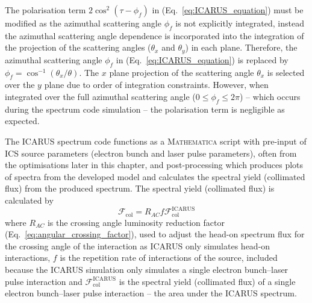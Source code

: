 \documentclass[../main.tex]{subfiles}
\begin{document}
The polarisation term $2\cos^{2}\left(\tau-\phi_{f}\right)$ in (Eq.~\ref{eq:ICARUS_equation}) must be modified as the azimuthal scattering angle $\phi_{f}$ is not explicitly integrated, instead the azimuthal scattering angle dependence is incorporated into the integration of the projection of the scattering angles ($\theta_{x}$ and $\theta_{y}$) in each plane. Therefore, the azimuthal scattering angle $\phi_{f}$ in (Eq.~\ref{eq:ICARUS_equation}) is replaced by $\phi_{f} = \cos^{-1}\left(\theta_{x}/\theta\right)$. The $x$ plane projection of the scattering angle $\theta_{x}$ is selected over the $y$ plane due to order of integration constraints. However, when integrated over the full azimuthal scattering angle ($0 \leq \phi_{f} \leq 2\pi$) -- which occurs during the spectrum code simulation -- the polarisation term is negligible as expected.

The \textsc{ICARUS} spectrum code functions as a \textsc{Mathematica} script with pre-input of ICS source parameters (electron bunch and laser pulse parameters), often from the optimisations later in this chapter, and post-processing which produces plots of spectra from the developed model and calculates the spectral yield (collimated flux) from the produced spectrum. The spectral yield (collimated flux) is calculated by 
\begin{equation}
\mathcal{F}_{\mathrm{col}} = R_{AC}f\mathcal{F}^{\mathrm{ICARUS}}_{\mathrm{col}}    
\label{eq:spectral_yield}
\end{equation}
where $R_{AC}$ is the crossing angle luminosity reduction factor (Eq.~\ref{eq:angular_crossing_factor}), used to adjust the head-on spectrum flux for the crossing angle of the interaction as \textsc{ICARUS} only simulates head-on interactions, $f$ is the repetition rate of interactions of the source, included because the \textsc{ICARUS} simulation only simulates a single electron bunch--laser pulse interaction and $\mathcal{F}^{\mathrm{ICARUS}}_{\mathrm{col}}$ is the spectral yield (collimated flux) of a single electron bunch--laser pulse interaction -- the area under the \textsc{ICARUS} spectrum. 
\end{document}
